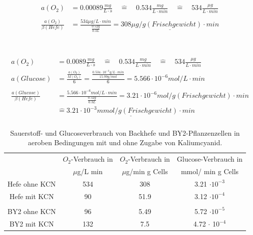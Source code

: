 \documentclass[10pt,a4paper]{article}
\begin{document}
		\begin{equation}\label{eq: Sauerstoffverbrauch}
			\begin{split}
				a(O_2)  &= 0.00089 \frac{mg}{L \cdot s} \quad\widehat{=} \quad 0.534 \frac{mg}{L \cdot min} \quad\widehat{=} \quad 534 \frac{\mu g}{L \cdot min}\\		
				\\
				\frac{a(O_2) }{\beta(Hefe)} &= \frac{534 \mu g/L \cdot min}{\frac{0.52 g}{0.3 L}} = \underline{308 \mu g/g(Frischgewicht)\cdot min}\\
			\end{split}
		\end{equation}
		\\
		\\
		\begin{equation}\label{eq: Glucoseverbrauch}
			\begin{split}
				a(O_2) &= 0.0089 \frac{mg}{L \cdot s} \quad\widehat{=} \quad 0.534 \frac{mg}{L \cdot min} \quad\widehat{=} \quad 534 \frac{\mu g}{L \cdot min}\\		
				a(Glucose) &= \frac{\frac{a(O_2) }{M(O_2)}}{6} = \frac{\frac{0.534 \cdot 10^{-3} g/ L \cdot min}{15.99 g/mol}}{6} = 5.566 \cdot 10^{-6} mol/ L \cdot min \\	
				\\
				\frac{a(Glucose) }{\beta(Hefe)} &= \frac{5.566 \cdot 10^{-6} mol/ L \cdot min}{\frac{0.52 g}{0.3 L}} = 3.21 \cdot 10 ^{-6} mol/g(Frischgewicht) \cdot min \\
				&\widehat{=} \underline{3.21 \cdot 10^{-3} mmol/g(Frischgewicht) \cdot min}\\
			\end{split}
		\end{equation}
	

		\begin{table}[H]
			\centering
			\caption{Sauerstoff- und Glucoseverbrauch von Backhefe und BY2-Pflanzenzellen in aeroben Bedingungen mit und ohne Zugabe von Kaliumcyanid.}
			\label{tab:O2verbrauch und CN}
			\begin{tabular}{cccc}
				\toprule
				&  $O_2$-Verbrauch in & $O_2$-Verbrauch in& Glucose-Verbrauch in\\
				& $\mu$g/L min & $\mu$g/min g Cells &  mmol/ min g Cells\\
				\midrule
				Hefe ohne KCN & 534 & 308 & 3.21 $\cdot 10 ^{-3}$\\
				Hefe mit KCN & 90& 51.9 & 3.12 $\cdot 10 ^{-4}$\\
				& & &\\
				BY2 ohne KCN & 96 & 5.49 & 5.72 $\cdot 10 ^{-5}$\\
				BY2 mit KCN & 132& 7.5 & 4.72 $\cdot$ 10$^{-4}$\\
				\bottomrule
			\end{tabular}
		\end{table}		
	
\end{document}
